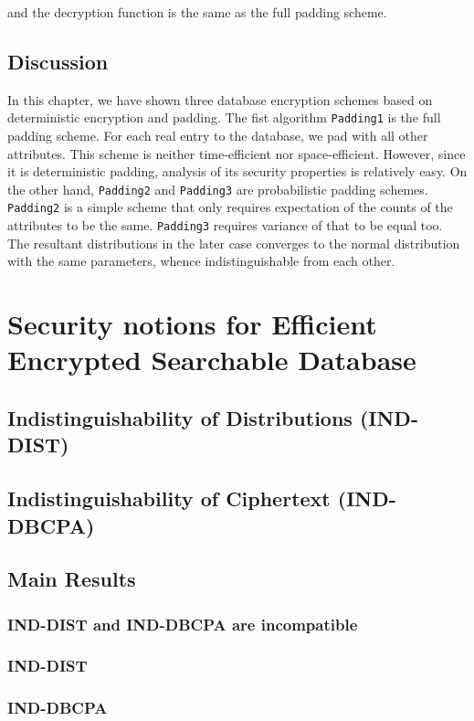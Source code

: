 \documentclass[10pt]{book}
\begin{document}
and the decryption function is the same as the full padding scheme.


\section{Discussion}
In this chapter, we have shown three database encryption schemes based on deterministic encryption and padding. The fist algorithm \texttt{Padding1} is the full padding scheme. For each real entry to the database, we pad with all other attributes. This scheme is neither time-efficient nor space-efficient. However, since it is deterministic padding, analysis of its security properties is relatively easy. On the other hand, \texttt{Padding2} and \texttt{Padding3} are probabilistic padding schemes. \texttt{Padding2} is a simple scheme that only requires expectation of the counts of the attributes to be the same. \texttt{Padding3} requires variance of that to be equal too. The resultant distributions in the later case converges to the normal distribution with the same parameters, whence indistinguishable from each other.




\chapter{Security notions for Efficient Encrypted Searchable Database}




\section{Indistinguishability of Distributions (IND-DIST)}




\section{Indistinguishability of Ciphertext (IND-DBCPA)}




\section{Main Results}
\subsection{IND-DIST and IND-DBCPA are incompatible}




\subsection{IND-DIST}




\subsection{IND-DBCPA}













{}
\end{document}

